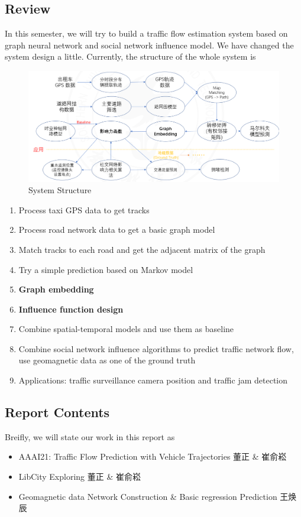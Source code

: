 \documentclass[fontset=none]{ctexart}
\theoremstyle{definition}
\theoremstyle{remark}
\begin{document}
\subsection{Review}
In this semester, we will try to build a traffic flow estimation system based on graph neural network and
social network influence model. We have changed the system design a little.
Currently, the structure of the whole system is

\begin{figure}[htb]
  \centering
  \includegraphics[width=\textwidth]{images/8-1-1.png}
  \caption{System Structure}
  \label{fig: structure}
\end{figure}

\begin{enumerate}
  \item Process taxi GPS data to get tracks
  \item Process road network data to get a basic graph model
  \item Match tracks to each road and get the adjacent matrix of the graph
  \item Try a simple prediction based on Markov model
  \item \textbf{Graph embedding}
  \item \textbf{Influence function design}
  \item Combine spatial-temporal models and use them as baseline
  \item Combine social network influence algorithms to predict traffic network flow, use geomagnetic data as one of the ground truth
  \item Applications: traffic surveillance camera position and traffic jam detection
\end{enumerate}

\subsection{Report Contents}
Breifly, we will state our work in this report as
\begin{itemize}
  \item AAAI21: Traffic Flow Prediction with Vehicle Trajectories 董正 \& 崔俞崧
  \item LibCity Exploring 董正 \& 崔俞崧
  \item Geomagnetic data Network Construction \& Basic regression Prediction 王焕辰
\end{itemize}
\end{document}
